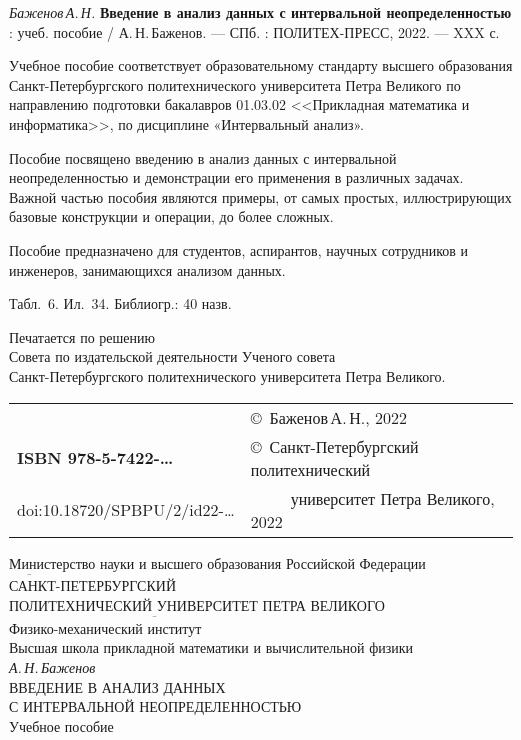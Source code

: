 \documentclass[a5paper,openany]{book}
\newcommand{\ov}{\overline}
\begin{document}
{\it Баженов\,А.\,Н.}
{\bf Введение в анализ данных с интервальной неопределенностью} : учеб. пособие /  А.\,Н.\,Баженов.
--- СПб. : ПОЛИТЕХ-ПРЕСС, 2022. --- XXX с.
\hfill \break

{\small 
	Учебное пособие соответствует образовательному стандарту высшего
образования Санкт-Петербургского политехнического университета Петра Великого по направлению подготовки бакалавров 01.03.02 <<Прикладная математика и информатика>>, по дисциплине «Интервальный анализ».


Пособие посвящено введению в анализ данных с интервальной неопределенностью
и демонстрации его применения в различных задачах.  
Важной частью пособия являются примеры, от самых простых, иллюстрирующих базовые конструкции и операции, до более сложных.

Пособие предназначено для студентов, аспирантов, научных сотрудников и инженеров, 
занимающихся анализом данных.


\hfill \break
Табл.~6. Ил.~34. Библиогр.: 40 назв.
\hfill \break
\hfill \break

 \begin{center}
{\small  	
Печатается по решению\\
Совета по издательской деятельности Ученого совета\\
Санкт-Петербургского политехнического  университета Петра Великого. }
 \end{center}

\hfill \break
\begin{tabular}{ll}
	~ & \copyright  \ Баженов\,А.\,Н., 2022 \\
{\bf ISBN 978-5-7422-\ldots} & \copyright \
Санкт-Петербургский политехнический \\
doi:10.18720/SPBPU/2/id22-\ldots & ~~~~~университет Петра Великого, 2022
\end{tabular}


\thispagestyle{empty}

\newpage
\begin{center}
	\hfill \break
	Министерство науки и высшего образования  Российской Федерации\\
$\ov{~~~~~~~~~~~~~}$\\
	\normalsize{	САНКТ-ПЕТЕРБУРГСКИЙ \\
		ПОЛИТЕХНИЧЕСКИЙ УНИВЕРСИТЕТ ПЕТРА ВЕЛИКОГО}\\ 
	$\ov{~~~~~~~~~~~~~~~~~~~~~~~~~~~~~~~~~~~~~~~~~~~~~~~~~~~~~~~~~~~~~~~~~~~~~~~~~~~~~~~~~~~~~~~~~~~~~~}$\\	
	{\small Физико-механический институт\\
	Высшая школа прикладной математики и вычислительной физики}\\
	\hfill \break
	\Large{\it А.\,Н.\,Баженов\\
		\hfill \break		\hfill \break		}
	{\Large	ВВЕДЕНИЕ В АНАЛИЗ ДАННЫХ\\
		С ИНТЕРВАЛЬНОЙ НЕОПРЕДЕЛЕННОСТЬЮ}\\
	\hfill \break 	\hfill \break	
	\Large{	Учебное пособие	
	}\\
\end{center}

}
\end{document}
